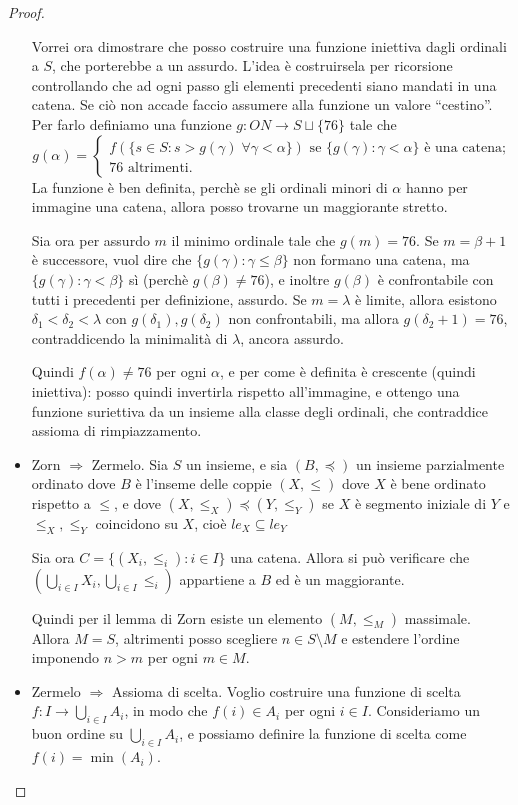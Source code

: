 \documentclass[a4paper,10pt,oneside]{article}
\newcommand{\trash}{76}
\theoremstyle{plain}
\theoremstyle{definition}
\theoremstyle{remark}
\begin{document}
\begin{proof}
\begin{itemize}
 Vorrei ora dimostrare che posso costruire una funzione iniettiva dagli ordinali a $S$, che porterebbe a un assurdo. L'idea è costruirsela per ricorsione controllando che ad ogni passo gli elementi precedenti siano mandati in una catena. Se ciò non accade faccio assumere alla funzione un valore ``cestino''.
 Per farlo definiamo una funzione $g: ON \rightarrow S \sqcup \{\trash\}$ tale che
 \[g(\alpha)=\left\{
 \begin{array}{l}
 f(\{s\in S:s>g(\gamma)\; \forall \gamma < \alpha\}) \textrm{ se } \{g(\gamma): \gamma < \alpha\} \textrm{ è una catena;}\\
 \trash \textrm{ altrimenti.}
 \end{array}
 \right.	
 \]
 La funzione è ben definita, perchè se gli ordinali minori di $\alpha$ hanno per immagine una catena, allora posso trovarne un maggiorante stretto.
	
 Sia ora per assurdo $m$ il minimo ordinale tale che $g(m)=\trash$. Se $m=\beta+1$ è successore, vuol dire che $\{g(\gamma):\gamma\le\beta\}$ non formano una catena, ma $\{g(\gamma):\gamma<\beta\}$ sì (perchè $g(\beta)\ne \trash$), e inoltre $g(\beta)$ è confrontabile con tutti i precedenti per definizione, assurdo. Se $m=\lambda$ è limite, allora esistono $\delta_1<\delta_2<\lambda$ con $g(\delta_1),g(\delta_2)$ non confrontabili, ma allora $g(\delta_2+1)=\trash$, contraddicendo la minimalità di $\lambda$, ancora assurdo.

 Quindi $f(\alpha)\ne\trash$ per ogni $\alpha$, e per come è definita è crescente (quindi iniettiva): posso quindi invertirla rispetto all'immagine, e ottengo una funzione suriettiva da un insieme alla classe degli ordinali, che contraddice assioma di rimpiazzamento.

 \item Zorn $\Rightarrow$ Zermelo. Sia $S$ un insieme, e sia $(B,\preceq)$ un insieme parzialmente ordinato dove $B$ è l'inseme delle coppie $(X,\le)$ dove $X$ è bene ordinato rispetto a $\le$, e dove $(X, \le_X) \preceq (Y,\le_Y)$ se $X$ è segmento iniziale di $Y$ e $\le_X, \le_Y$ coincidono su $X$, cioè $le_X \subseteq le_Y$
 
 Sia ora $C=\{(X_i,\le_i):i\in I\}$ una catena. Allora si può verificare che $(\bigcup_{i\in I}X_i,\bigcup_{i\in I}\le_i)$ appartiene a $B$ ed è un maggiorante.
 
 Quindi per il lemma di Zorn esiste un elemento $(M,\le_M)$ massimale. Allora $M=S$, altrimenti posso scegliere $n\in S\setminus M$ e estendere l'ordine imponendo $n>m$ per ogni $m\in M$.
 
 \item Zermelo $\Rightarrow$ Assioma di scelta. Voglio costruire una funzione di scelta $f: I  \rightarrow \bigcup_{i\in I}A_i$, in modo che $f(i)\in A_i$ per ogni $i\in I$. Consideriamo un buon ordine su $\bigcup_{i\in I}A_i$, e possiamo definire la funzione di scelta come $f(i)=\min(A_i)$.

\end{itemize}
\end{proof}
\end{document}
